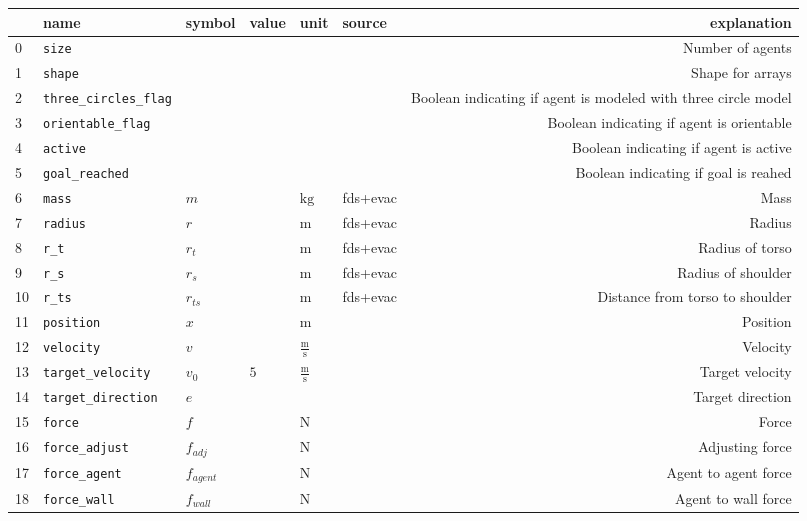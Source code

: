 \begin{tabularx}{\linewidth}{llllllR}
\toprule
{} &                            name &            symbol &                      value &                         unit &     source &                                                              explanation \\
  &  \verb|size| &   &   &   &   &  Number of agents \\
1  &  \verb|shape| &   &   &   &   &  Shape for arrays \\
2  &  \verb|three_circles_flag| &   &   &   &   &  Boolean indicating if agent is modeled with three circle model \\
3  &  \verb|orientable_flag| &   &   &   &   &  Boolean indicating if agent is orientable  \\
4  &  \verb|active| &   &   &   &   &  Boolean indicating if agent is active \\
5  &  \verb|goal_reached| &   &   &   &   &  Boolean indicating if goal is reahed \\
6  &  \verb|mass| &  $m$ &   &  $\mathrm{kg}$ &  fds+evac &  Mass \\
7  &  \verb|radius| &  $r$ &   &  $\mathrm{m}$ &  fds+evac &  Radius \\
8  &  \verb|r_t| &  $r_{t}$ &   &  $\mathrm{m}$ &  fds+evac &  Radius of torso \\
9  &  \verb|r_s| &  $r_{s}$ &   &  $\mathrm{m}$ &  fds+evac &  Radius of shoulder \\
10 &  \verb|r_ts| &  $r_{ts}$ &   &  $\mathrm{m}$ &  fds+evac &  Distance from torso to shoulder \\
11 &  \verb|position| &  $x$ &   &  $\mathrm{m}$ &   &  Position \\
12 &  \verb|velocity| &  $v$ &   &  $\mathrm{\frac{m}{s}}$ &   &  Velocity \\
13 &  \verb|target_velocity| &  $v_{0}$ &  $5$ &  $\mathrm{\frac{m}{s}}$ &   &  Target velocity \\
14 &  \verb|target_direction| &  $e$ &   &   &   &  Target direction \\
15 &  \verb|force| &  $f$ &   &  $\mathrm{N}$ &   &  Force \\
16 &  \verb|force_adjust| &  $f_{adj}$ &   &  $\mathrm{N}$ &   &  Adjusting force \\
17 &  \verb|force_agent| &  $f_{agent}$ &   &  $\mathrm{N}$ &   &  Agent to agent force \\
18 &  \verb|force_wall| &  $f_{wall}$ &   &  $\mathrm{N}$ &   &  Agent to wall force \\

\end{tabularx}
